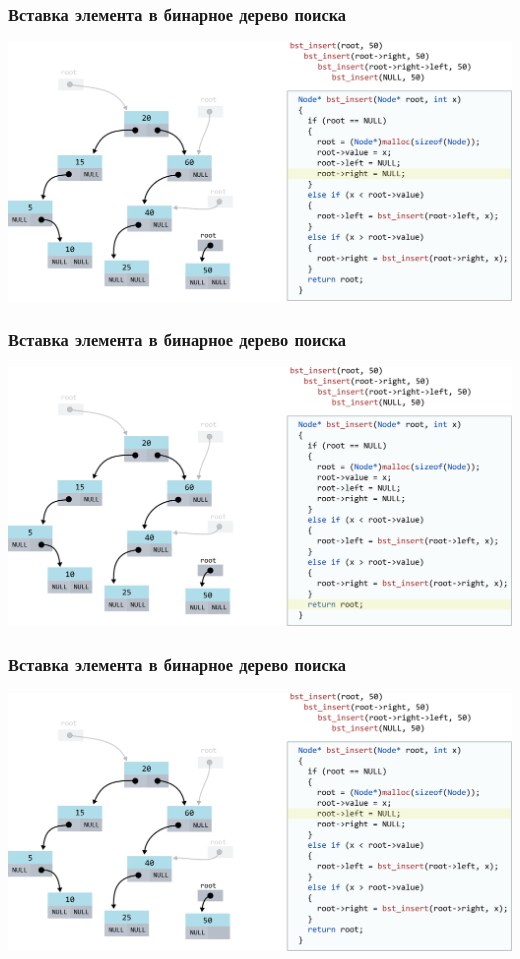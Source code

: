 \documentclass[10pt,pdf,hyperref={unicode}]{beamer}
\begin{document}
\begin{frame}[fragile]
\frametitle{Вставка элемента в бинарное дерево поиска}
\begin{center}
\includegraphics[scale=0.6]{images/tree/codetree/codetree15.png}
\end{center}
\end{frame}
\begin{frame}[fragile]
\frametitle{Вставка элемента в бинарное дерево поиска}
\begin{center}
\includegraphics[scale=0.6]{images/tree/codetree/codetree16.png}
\end{center}
\end{frame}
\begin{frame}[fragile]
\frametitle{Вставка элемента в бинарное дерево поиска}
\begin{center}
\includegraphics[scale=0.6]{images/tree/codetree/codetree14.png}
\end{center}
\end{frame}
\end{document}
